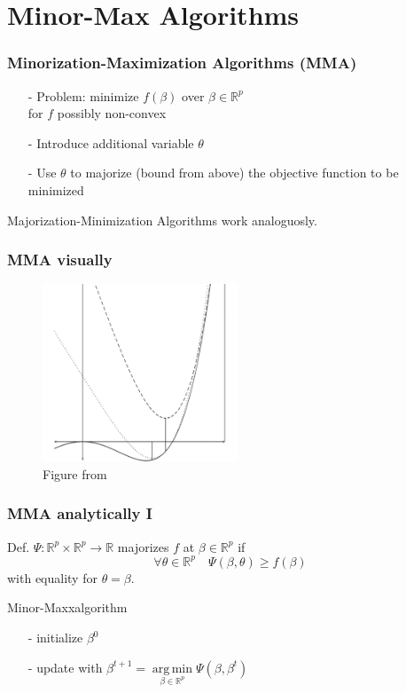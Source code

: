 \documentclass{beamer}
\newcommand{\R}{\mathbb{R}}
\DeclareMathOperator*{\argmin}{arg\,min}
\begin{document}
\section*{Minor-Max Algorithms}

\begin{frame}
\frametitle{Minorization-Maximization Algorithms (MMA)}
\begin{itemize}
\item[-] Problem: minimize $f(\beta)$ over $\beta\in\R^p$\\ for $f$ possibly non-convex
\item[-] Introduce additional variable $\theta$
\item[-] Use $\theta$ to majorize (bound from above) the objective function to be minimized
\end{itemize}


{\small Majorization-Minimization Algorithms work analoguosly.}
\end{frame}

\begin{frame}
\frametitle{MMA visually}
\begin{figure}
\includegraphics[height=150pt]{img/minmaxalgo2.png}
\caption{Figure from \cite{DL15}}
\end{figure}

\end{frame}

\begin{frame}
\frametitle{MMA analytically I}
Def. 
$\Psi:\R^p\times\R^p\to\R$ {\color{blue}majorizes} $f$ at $\beta\in\R^p$ if \[\forall\theta\in\R^p\quad \Psi(\beta,\theta)\ge f(\beta)\]
with equality for $\theta=\beta$.
\vspace{10pt}

Minor-Maxxalgorithm
\begin{itemize}
\item[-] initialize $\beta^0$
\item[-] update with $\beta^{t+1}=\argmin\limits_{\beta\in\R^p}\Psi(\beta,\beta^t)$
\end{itemize}
\end{frame}
\end{document}

